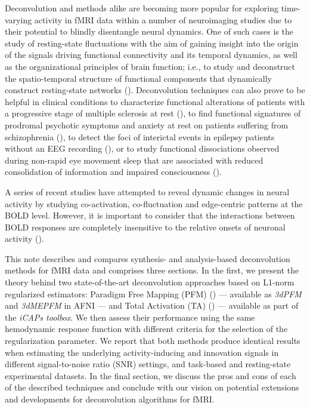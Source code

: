 Deconvolution and methods alike are becoming more popular for exploring time-varying activity in fMRI data within a number of neuroimaging studies due to their potential to blindly disentangle neural dynamics. One of such cases is the study of resting-state fluctuations with the aim of gaining insight into the origin of the signals driving functional connectivity and its temporal dynamics, as well as the organizational principles of brain function; i.e., to study and deconstruct the spatio-temporal structure of functional components that dynamically construct resting-state networks (\citealt{petridou2013PeriodsRestFMRI,karahanoglu2015TransientBrainActivity,karahanoglu2017DynamicsLargescaleFMRI,kinany2020DynamicFunctionalConnectivity, gonzalez-castillo2019ImagingSpontaneousFlow,allan2015FunctionalConnectivityMRI, zamaniesfahlani2020HighamplitudeCofluctuationsCortical}). Deconvolution techniques can also prove to be helpful in clinical conditions to characterize functional alterations of patients with a progressive stage of multiple sclerosis at rest (\citealt{bommarito2020FunctionalNetworkDynamicsa}), to find functional signatures of prodromal psychotic symptoms and anxiety at rest on patients suffering from schizophrenia (\citealt{zoller2019LargeScaleBrainNetwork}), to detect the foci of interictal events in epilepsy patients without an EEG recording (\citealt{lopes2012DetectionEpilepticActivity}), or to study functional dissociations observed during non-rapid eye movement sleep that are associated with reduced consolidation of information and impaired consciousness (\citealt{tarun2021NREMSleepStagesa}).

A series of recent studies have attempted to reveal dynamic changes in neural activity by studying co-activation, co-fluctuation and edge-centric patterns at the BOLD level. However, it is important to consider that the interactions between BOLD responses are completely insensitive to the relative onsets of neuronal activity (\citealt{gitelman2003ModelingRegionalPsychophysiologic}).

This note describes and compares synthesis- and analysis-based deconvolution methods for fMRI data and comprises three sections. In the first, we present the theory behind two state-of-the-art deconvolution approaches based on L1-norm regularized estimators: Paradigm Free Mapping (PFM) (\citealt{caballerogaudes2013ParadigmFreeMapping}) --- available as \textit{3dPFM} and \textit{3dMEPFM} in AFNI --- and Total Activation (TA) (\citealt{karahanoglu2013TotalActivationFMRI}) --- available as part of the \textit{iCAPs toolbox}. We then assess their performance using the same hemodynamic response function with different criteria for the selection of the regularization parameter. We report that both methods produce identical results when estimating the underlying activity-inducing and innovation signals in different signal-to-noise ratio (SNR) settings, and task-based and resting-state experimental datasets. In the final section, we discuss the pros and cons of each of the described techniques and conclude with our vision on potential extensions and developments for deconvolution algorithms for fMRI.